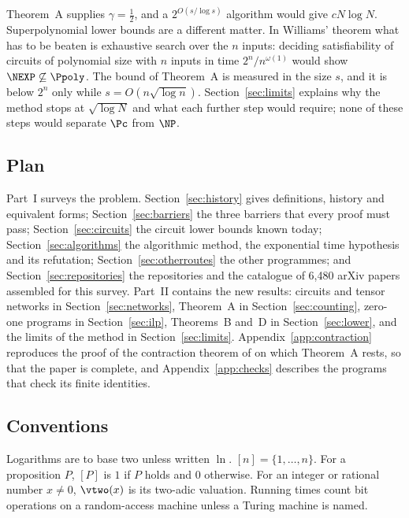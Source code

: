 Theorem~A supplies $\gamma=\tfrac12$, and a $2^{O(s/\log s)}$ algorithm would
give $cN\log N$. Superpolynomial lower bounds are a different matter. In
Williams' theorem \cite{Wil13} what has to be beaten is exhaustive search over
the $n$ inputs: deciding satisfiability of circuits of polynomial size with $n$
inputs in time $2^n/n^{\omega(1)}$ would show $\NEXP\not\subseteq\Ppoly$. The
bound of Theorem~A is measured in the size $s$, and it is below $2^n$ only while
$s=O(n\sqrt{\log n})$. Section~\ref{sec:limits} explains why the method stops
at $\sqrt{\log N}$ and what each further step would require; none of these
steps would separate $\Pc$ from $\NP$.

\subsection{Plan}
Part~I surveys the problem. Section~\ref{sec:history} gives definitions, history
and equivalent forms; Section~\ref{sec:barriers} the three barriers that every
proof must pass; Section~\ref{sec:circuits} the circuit lower bounds known
today; Section~\ref{sec:algorithms} the algorithmic method, the exponential time
hypothesis and its refutation; Section~\ref{sec:otherroutes} the other
programmes; and Section~\ref{sec:repositories} the repositories and the
catalogue of 6,480 arXiv papers assembled for this survey. Part~II contains the
new results: circuits and tensor networks in Section~\ref{sec:networks},
Theorem~A in Section~\ref{sec:counting}, zero-one programs in
Section~\ref{sec:ilp}, Theorems~B and~D in Section~\ref{sec:lower}, and the
limits of the method in Section~\ref{sec:limits}.
Appendix~\ref{app:contraction} reproduces the proof of the contraction theorem
of \oai{} \cite[Appendix D.4]{OAI26} on which Theorem~A rests, so that the paper
is complete, and Appendix~\ref{app:checks} describes the programs that check its
finite identities.

\subsection*{Conventions}
Logarithms are to base two unless written $\ln$. $[n]=\{1,\dots,n\}$. For a
proposition $P$, $[P]$ is $1$ if $P$ holds and $0$ otherwise. For an integer or
rational number $x\ne0$, $\vtwo(x)$ is its two-adic valuation. Running times
count bit operations on a random-access machine unless a Turing machine is named.
